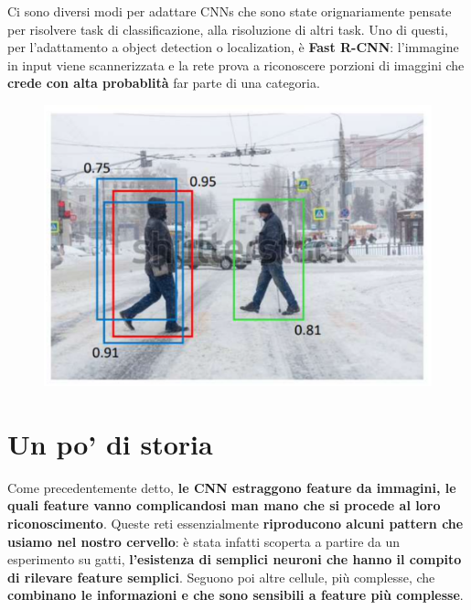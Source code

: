 Ci sono diversi modi per adattare CNNs che sono state orignariamente pensate per risolvere task di classificazione, alla risoluzione di altri task. Uno di questi, per l'adattamento a object detection o localization, è \textbf{Fast R-CNN}: l'immagine in input viene scannerizzata e la rete prova a riconoscere porzioni di imaggini che \textbf{crede con alta probablità} far parte di una categoria.
\begin{figure}[!h]
    \includegraphics[scale=.45]{images/cnn/rcnn.png}
    \centering
\end{figure}

\newpage



\section{Un po' di storia}
Come precedentemente detto,  \textbf{le CNN estraggono feature da immagini, le quali feature vanno complicandosi man mano che si procede al loro riconoscimento}. Queste reti essenzialmente \textbf{riproducono alcuni pattern che usiamo nel nostro cervello}: è stata infatti scoperta a partire da un esperimento su gatti, \textbf{l'esistenza di semplici neuroni che hanno il compito di rilevare feature semplici}. Seguono poi altre cellule, più complesse, che \textbf{combinano le informazioni e che sono sensibili a feature più complesse}. 



